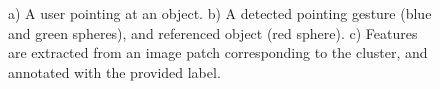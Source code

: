 \documentclass{tADR2e}
\begin{document}
\begin{figure}
\begin{center}
\begin{minipage}{160mm}
\caption{a) A user pointing at an object. b) A detected pointing gesture
(blue and green spheres), and referenced object (red sphere). c) Features are
extracted from an image patch corresponding to the cluster, and annotated with the
provided label.} \label{fig:labeling_objects}
\end{minipage}
\end{center}
\end{figure}
\end{document}
